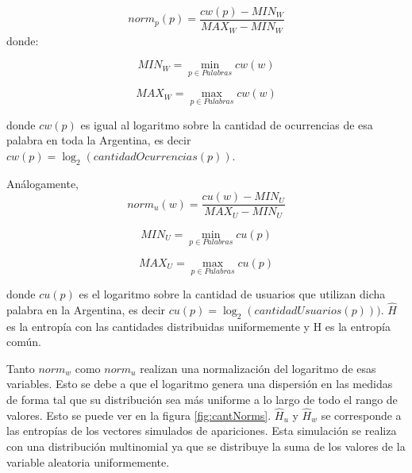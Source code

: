 \begin{equation}
norm_{p}(p) = \frac{cw(p)- MIN_W }{MAX_W - MIN_W}
\end{equation}
donde:
\noindent\begin{minipage}{.5\linewidth}
\begin{equation}
  MIN_W = \min\limits_{p \in Palabras} cw(w)
\end{equation}
\end{minipage}%
\begin{minipage}{.5\linewidth}
\begin{equation}
  MAX_W = \max\limits_{p \in Palabras} cw(w)
\end{equation}
\end{minipage}
donde $cw(p)$ es igual al logaritmo sobre la cantidad de ocurrencias de esa palabra en toda la Argentina, es decir $cw(p) = \log_2(cantidadOcurrencias(p))$.

Análogamente,
\begin{equation}
norm_{u}(w) = \frac{cu(w)- MIN_U }{MAX_U - MIN_U}
\end{equation}
\noindent\begin{minipage}{.5\linewidth}
\begin{equation}
  MIN_U = \min\limits_{p \in Palabras} cu(p)
\end{equation}
\end{minipage}%
\begin{minipage}{.5\linewidth}
\begin{equation}
  MAX_U = \max\limits_{p \in Palabras} cu(p)
\end{equation}
\end{minipage}
donde $cu(p)$ es el logaritmo sobre  la cantidad de usuarios que utilizan dicha palabra en la Argentina, es decir $cu(p)= \log_2(cantidadUsuarios(p)))$.
$\widehat{H}$ es la entropía con las cantidades distribuidas uniformemente y H es la entropía común.

Tanto $norm_{w}$ como $norm_{u}$ realizan una normalización del logaritmo de esas variables. Esto se debe a que el logaritmo genera una dispersión en las medidas de forma tal que su distribución sea más uniforme a lo largo de todo el rango de valores. Esto se puede ver en la figura \ref{fig:cantNorms}.
$\widehat{H}_{u}$ y $\widehat{H}_{w}$ se corresponde a las entropías de los vectores simulados de apariciones.
Esta simulación se realiza con una distribución multinomial ya que se distribuye la suma de los valores de la variable aleatoria uniformemente. 


